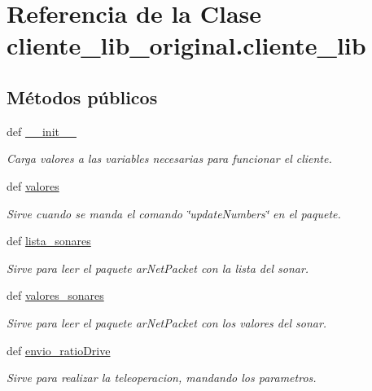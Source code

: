 \hypertarget{classcliente__lib__original_1_1cliente__lib}{
\section{Referencia de la Clase cliente\_\-lib\_\-original.cliente\_\-lib}
\label{classcliente__lib__original_1_1cliente__lib}
}
\subsection*{Métodos públicos}
\begin{DoxyCompactItemize}
\item 
def \hyperlink{classcliente__lib__original_1_1cliente__lib_a1edb12a09794f57a5c681bc5aac49650}{\_\-\_\-init\_\-\_\-}
\begin{DoxyCompactList}\small\item\em Carga valores a las variables necesarias para funcionar el cliente. \end{DoxyCompactList}\item 
def \hyperlink{classcliente__lib__original_1_1cliente__lib_a5f97cbead3de2cb78534afec8343c13e}{valores}
\begin{DoxyCompactList}\small\item\em Sirve cuando se manda el comando \char`\"{}updateNumbers\char`\"{} en el paquete. \end{DoxyCompactList}\item 
def \hyperlink{classcliente__lib__original_1_1cliente__lib_a01b5aae2c3ce57fca590b9d06e767f23}{lista\_\-sonares}
\begin{DoxyCompactList}\small\item\em Sirve para leer el paquete arNetPacket con la lista del sonar. \end{DoxyCompactList}\item 
def \hyperlink{classcliente__lib__original_1_1cliente__lib_a2ab0872984bef5af4bfbb7d2ec7f40c5}{valores\_\-sonares}
\begin{DoxyCompactList}\small\item\em Sirve para leer el paquete arNetPacket con los valores del sonar. \end{DoxyCompactList}\item 
def \hyperlink{classcliente__lib__original_1_1cliente__lib_aac50c9462dfe46d1b618692d7206295b}{envio\_\-ratioDrive}
\begin{DoxyCompactList}\small\item\em Sirve para realizar la teleoperacion, mandando los parametros. \end{DoxyCompactList}\item 

\end{DoxyCompactItemize}
